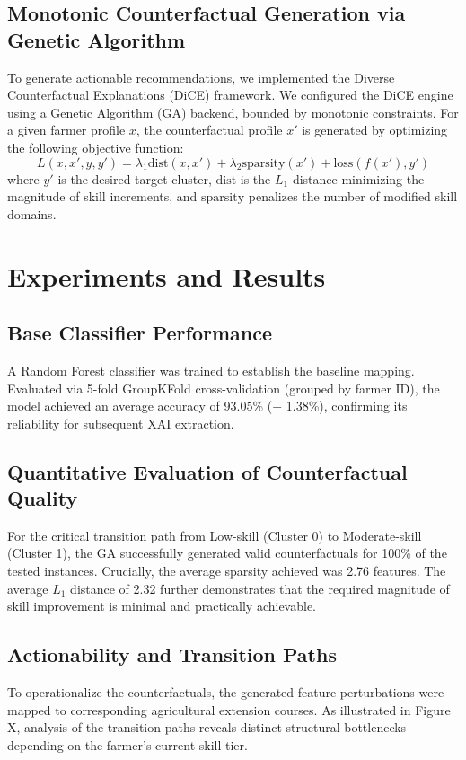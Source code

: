 \documentclass[12pt, a4paper]{article}
\begin{document}
\subsection{Monotonic Counterfactual Generation via Genetic Algorithm}
To generate actionable recommendations, we implemented the Diverse Counterfactual Explanations (DiCE) framework. We configured the DiCE engine using a Genetic Algorithm (GA) backend, bounded by monotonic constraints. For a given farmer profile $x$, the counterfactual profile $x'$ is generated by optimizing the following objective function:
\begin{equation}
L(x, x', y, y') = \lambda_1 \text{dist}(x, x') + \lambda_2 \text{sparsity}(x') + \text{loss}(f(x'), y')
\end{equation}
where $y'$ is the desired target cluster, $\text{dist}$ is the $L_1$ distance minimizing the magnitude of skill increments, and $\text{sparsity}$ penalizes the number of modified skill domains.

\section{Experiments and Results}\label{sec4}
\subsection{Base Classifier Performance}
A Random Forest classifier was trained to establish the baseline mapping. Evaluated via 5-fold GroupKFold cross-validation (grouped by farmer ID), the model achieved an average accuracy of 93.05\% ($\pm$ 1.38\%), confirming its reliability for subsequent XAI extraction.

\subsection{Quantitative Evaluation of Counterfactual Quality}
For the critical transition path from Low-skill (Cluster 0) to Moderate-skill (Cluster 1), the GA successfully generated valid counterfactuals for 100\% of the tested instances. Crucially, the average sparsity achieved was 2.76 features. The average $L_1$ distance of 2.32 further demonstrates that the required magnitude of skill improvement is minimal and practically achievable.

\subsection{Actionability and Transition Paths}
To operationalize the counterfactuals, the generated feature perturbations were mapped to corresponding agricultural extension courses. As illustrated in Figure X, analysis of the transition paths reveals distinct structural bottlenecks depending on the farmer's current skill tier. 
\end{document}

